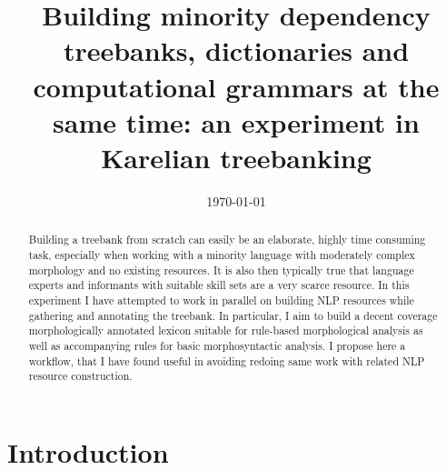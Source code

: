 \documentclass{flammie}
\newif\ifcameraready%
\begin{document}
\title{Building minority dependency treebanks, dictionaries and computational
grammars at the same time: an experiment in Karelian treebanking}

\ifcameraready{}
\author{Tommi A Pirinen\\
Universität Hamburg\\
Hamburger Zentrum für Sprachkorpora\\
Max-Brauer-Allee 60, D-22765 Hamburg\\
\url{tommi.antero.pirinen@uni-hamburg.de}
}
\fi

\date{\today}


\maketitle

\begin{abstract}
    Building a treebank from scratch can easily be an elaborate, highly time
    consuming task, especially when working with a minority
    language with moderately complex morphology and no existing resources. It is
    also then typically true that language experts and informants with
    suitable skill sets are a very scarce resource.  In this experiment I have
    attempted to work in parallel on building NLP resources while gathering and
    annotating the treebank. In particular, I aim to build a decent coverage
    morphologically annotated lexicon suitable for rule-based morphological
    analysis as well as accompanying rules for basic morphosyntactic analysis.
    I propose here a workflow, that I have found useful in avoiding redoing same
    work with related NLP resource construction.
\end{abstract}



\section{Introduction}
\end{document}
